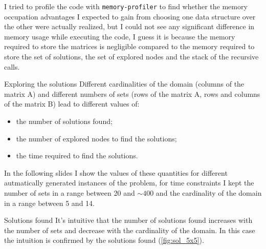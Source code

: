 \documentclass{beamer}
\begin{document}
\begin{frame}
    I tried to profile the code with \texttt{memory-profiler} 
    to find whether the memory occupation
    advantages
    I expected to gain from choosing one data structure over the other
    were actually realized, but I could not see any significant difference
    in memory usage while executing the code, I guess it is because
    the memory required to store the matrices is negligible compared
    to the memory required to store the set of solutions, the set of explored nodes
    and the stack of the recursive calls.
\end{frame}


\begin{frame}{Exploring the solutions}
    Different cardinalities of the domain (columns of the matrix A) and
    different numbers of sets (rows of the matrix A, rows and columns of the matrix B) 
    lead to different values of:
    \begin{itemize}
        \item the number of solutions found;
        \item the number of explored nodes to find the solutions;
        \item the time required to find the solutions.
    \end{itemize}
    In the following slides I show the values of these quantities for different
    autmatically generated instances of the problem, for time constraints I kept the 
    number of sets in a range between 20 and $\sim400$ and the cardinality of the domain
    in a range between 5 and 14.
\end{frame}

\begin{frame}{Solutions found}
    It's intuitive that the number of solutions found increases
    with the number of sets and decrease with the cardinality of the domain.
    In this case the intuition is confirmed by the solutions found (\ref{fig:sol_5x5}).
\end{frame}
\end{document}
